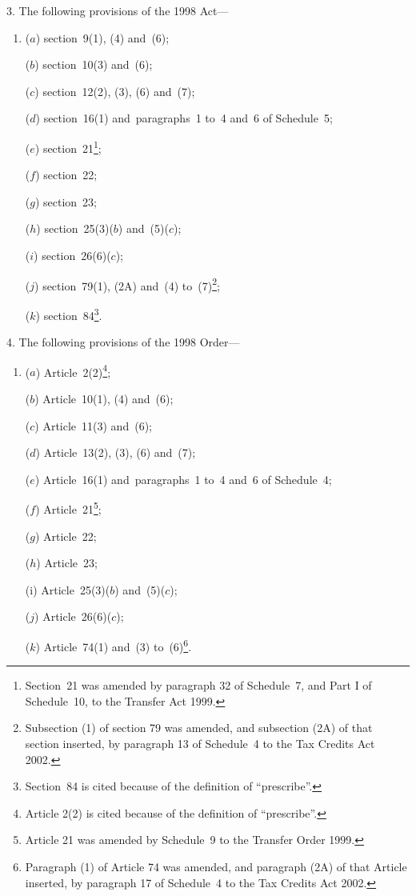 \documentclass[12pt,a4paper]{article}
\begin{document}
3.  The following provisions of the 1998 Act—
\begin{enumerate}\item[]
($a$) section~9(1), (4) and~(6);

($b$) section~10(3) and~(6);

($c$) section~12(2), (3), (6) and~(7);

($d$) section~16(1) and~paragraphs~1 to~4 and~6 of Schedule~5;

($e$) section~21\footnote{Section~21 was amended by paragraph 32 of Schedule~7, and Part I of Schedule~10, to the Transfer Act 1999.};

($f$) section~22;

($g$) section~23;

($h$) section~25(3)($b$)  and~(5)($c$);

($i$) section~26(6)($c$);

($j$) section~79(1), (2A) and~(4) to~(7)\footnote{Subsection (1) of section 79 was amended, and subsection (2A) of that section inserted, by paragraph 13 of Schedule~4 to the Tax Credits Act 2002.};

($k$) section~84\footnote{Section~84 is cited because of the definition of “prescribe”.}.
\end{enumerate}

\medskip

4.  The following provisions of the 1998 Order—
\begin{enumerate}\item[]
($a$) Article~2(2)\footnote{Article 2(2) is cited because of the definition of “prescribe”.};

($b$) Article~10(1), (4) and~(6);

($c$) Article~11(3) and~(6);

($d$) Article~13(2), (3), (6) and~(7);

($e$) Article~16(1) and~paragraphs~1 to~4 and~6 of Schedule~4;

($f$) Article~21\footnote{Article 21 was amended by Schedule~9 to the Transfer Order 1999.};

($g$) Article~22;

($h$) Article~23;

(i) Article~25(3)($b$)  and~(5)($c$);

($j$) Article~26(6)($c$);

($k$) Article~74(1) and~(3) to~(6)\footnote{Paragraph (1) of Article 74 was amended, and paragraph (2A) of that Article inserted, by paragraph 17 of Schedule~4 to the Tax Credits Act 2002.}.
\end{enumerate}
\end{document}

